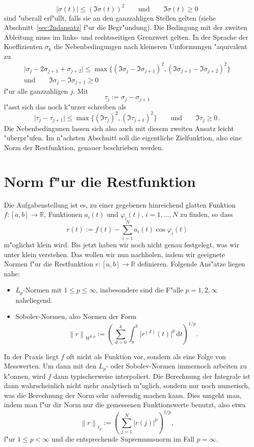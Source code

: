 \documentclass[a4paper]{scrartcl}
\newcommand{\R}{{\mathbb{R}}}
\newcommand{\de}{{\mathrm{d}}}
\newcommand{\norm}[1]{{\left\lVert#1\right\rVert}}
\newcommand{\pphi}{{\varphi}}
\begin{document}
$$ \lvert\ddot\sigma(t)\rvert \le (\Im\dot\sigma(t))^2 
\qquad \text{und} \qquad
\Im\dot\sigma(t)\ge0 $$
sind "uberall erf"ullt, falls sie an den ganzzahligen Stellen gelten (siehe Abschnitt~\ref{sec:2ndansatz} f"ur die Begr"undung). Die Bedingung mit der zweiten Ableitung muss im links- und rechtsseitigen Grenzwert gelten. In der Sprache der Koeffizienten $\sigma_k$ die Nebenbedingungen nach kleineren Umformungen "aquivalent zu 
\begin{gather*}
\lvert\sigma_j-2\sigma_{j+1}+\sigma_{j+2}\rvert 
\le \max\{(\Im\sigma_j-\Im\sigma_{j+1})^2, 
    (\Im\sigma_{j+1}-\Im\sigma_{j+2})^2\} \\
\text{und} \qquad
\Im\sigma_j-\Im\sigma_{j+1}
\ge 0
\end{gather*}
f"ur alle ganzzahligen $j$. Mit 
$$ \tau_j := \sigma_j-\sigma_{j+1} $$
l"asst sich das noch k"urzer schreiben als
$$ \lvert\tau_j-\tau_{j+1}\rvert \le \max\{(\Im\tau_j)^2, (\Im\tau_{j+1})^2\}
\qquad \text{und} \qquad
\Im\tau_j \ge 0\,. $$
Die Nebenbedingunen lassen sich also auch mit diesem zweiten Ansatz leicht "uberpr"ufen. Im n"achsten Abschnitt soll die eigentliche Zielfunktion, also eine Norm der Restfunktion, genauer beschrieben werden.


\section{Norm f"ur die Restfunktion} \label{sec:norms4r}

Die Aufgabenstellung ist es, zu einer gegebenen hinreichend glatten Funktion $f:[a,b]\to\R$, Funktionen $a_i(t)$ und $\pphi_i(t)$, $i=1,\dotsc,N$ zu finden, so dass 
$$ r(t) := f(t)-\sum_{i=1}^N a_i(t)\cos\pphi_i(t) $$
m"oglichst klein wird. Bis jetzt haben wir noch nicht genau festgelegt, was wir unter \glqq{}klein\grqq{} verstehen. Das wollen wir nun nachholen, indem wir geeignete Normen f"ur die Restfunktion $r:[a,b]\to\R$ definieren. Folgende Ans"atze liegen nahe:
\begin{itemize}
\item $L_p$-Normen mit $1\le p\le\infty$, insbesondere sind die F"alle $p=1,2,\infty$ naheliegend. 
\item Sobolev-Normen, also Normen der Form
$$ \norm{r}_{W^{k,p}} := \left(\,\sum_{d=0}^k\int_a^b \lvert r^{(d)}(t)\rvert^p\,\de t\right)^{1/p}. $$
\end{itemize}
In der Praxis liegt $f$ oft nicht als Funktion vor, sondern als eine Folge von Messwerten. Um dann mit den $L_p$- oder Sobolev-Normen immernoch arbeiten zu k"onnen, wird $f$ dann typischerweise interpoliert. Die Berechnung der Integrale ist dann wahrscheinlich nicht mehr analytisch m"oglich, sondern nur noch numerisch, was die Berechnung der Norm sehr aufwendig machen kann. Dies umgeht man, indem man f"ur dir Norm nur die gemessenen Funktionswerte benutzt, also etwa
$$ \norm{r}_{\ell_p} := \left(\,\sum_{j=1}^{N}\lvert r(j)\rvert^p\right)^{1/p}, $$
f"ur $1\le p<\infty$ und die entsprechende Supremumsnorm im Fall $p=\infty$. 
\end{document}
